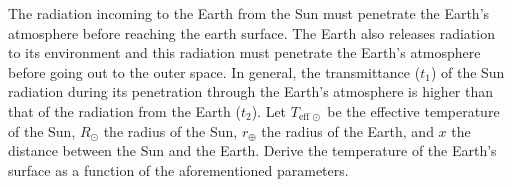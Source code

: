 The radiation incoming to the Earth from the Sun must penetrate the Earth's
atmosphere before reaching the earth surface. The Earth also releases radiation
to its environment and this radiation must penetrate the Earth's atmosphere
before going out to the outer space. In general, the transmittance ($t_1$) of
the Sun radiation during its penetration through the Earth's atmosphere is
higher than that of the radiation from the Earth ($t_2$). Let
$T_{\mathrm{eff}\,\odot}$ be the effective temperature of the Sun, $R_\odot$
the radius of the Sun, $r_\oplus$ the radius of the Earth, and $x$ the distance
between the Sun and the Earth. Derive the temperature of the Earth's surface as
a function of the aforementioned parameters.
